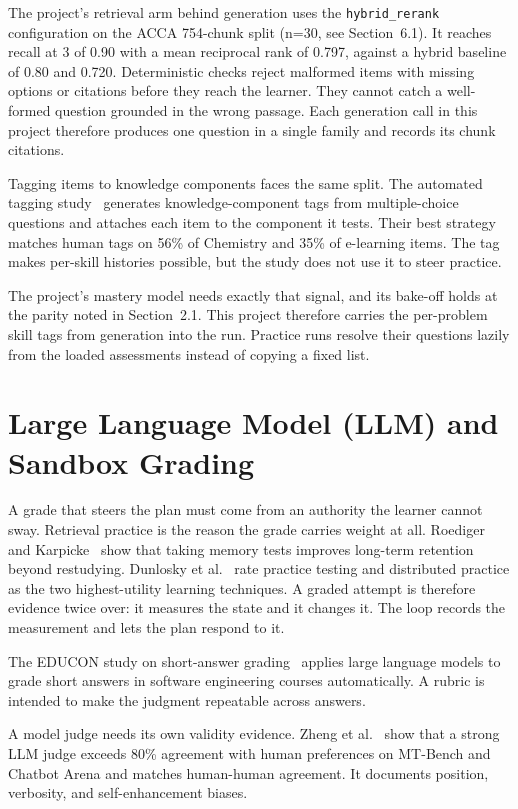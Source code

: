 The project's retrieval arm behind generation uses the \texttt{hybrid\_rerank} configuration on the ACCA 754-chunk split (n=30, see Section~6.1). It reaches recall at 3 of 0.90 with a mean reciprocal rank of 0.797, against a hybrid baseline of 0.80 and 0.720. Deterministic checks reject malformed items with missing options or citations before they reach the learner. They cannot catch a well-formed question grounded in the wrong passage. Each generation call in this project therefore produces one question in a single family and records its chunk citations.

Tagging items to knowledge components faces the same split. The automated tagging study~\cite{kctag2024} generates knowledge-component tags from multiple-choice questions and attaches each item to the component it tests. Their best strategy matches human tags on 56\% of Chemistry and 35\% of e-learning items. The tag makes per-skill histories possible, but the study does not use it to steer practice.

The project's mastery model needs exactly that signal, and its bake-off holds at the parity noted in Section~2.1. This project therefore carries the per-problem skill tags from generation into the run. Practice runs resolve their questions lazily from the loaded assessments instead of copying a fixed list.

\section{Large Language Model (LLM) and Sandbox Grading}
A grade that steers the plan must come from an authority the learner cannot sway. Retrieval practice is the reason the grade carries weight at all. Roediger and Karpicke~\cite{roediger2006} show that taking memory tests improves long-term retention beyond restudying. Dunlosky et al.~\cite{dunlosky2013} rate practice testing and distributed practice as the two highest-utility learning techniques. A graded attempt is therefore evidence twice over: it measures the state and it changes it. The loop records the measurement and lets the plan respond to it.

The EDUCON study on short-answer grading~\cite{llmgrade2024} applies large language models to grade short answers in software engineering courses automatically. A rubric is intended to make the judgment repeatable across answers.

A model judge needs its own validity evidence. Zheng et al.~\cite{zheng2023} show that a strong LLM judge exceeds 80\% agreement with human preferences on MT-Bench and Chatbot Arena and matches human-human agreement. It documents position, verbosity, and self-enhancement biases.

